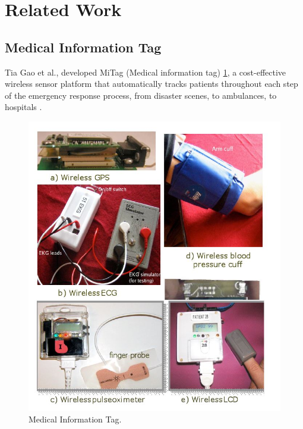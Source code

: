\section{Related Work}

\subsection{Medical Information Tag}

Tia Gao et al., developed MiTag (Medical information tag) \ref{fig:miTag}, a cost-effective 
wireless sensor platform that automatically tracks patients 
throughout each step of the emergency response process, from disaster scenes, to ambulances, to hospitals \cite{miTag}.

\begin{figure}
	\centering
	\includegraphics[scale = 0.6 ]{miTag}
	\caption{Medical Information Tag. \cite{miTag}\label{fig:miTag}}
\end{figure}

